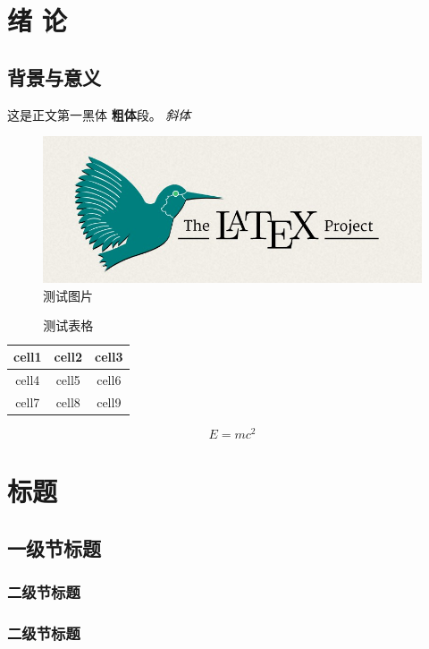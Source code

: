 \documentclass{swjtuthesis}
\begin{document}
\maketot

\startmainmatter

\chapter{绪 论}
\section{背景与意义}

这是正文第一{\heiti 黑体 \textbf{粗体}}段\supercite{stump2000user}。
\textit{斜体}

\begin{figure}[hbt]
    \centering
    \includegraphics[width=0.7\linewidth]{example.jpg}
    \caption{测试图片}
\end{figure}

\begin{table}[hbt]
    \centering
    \caption{测试表格}
    \begin{tabular}{ c|c|c } 
    \hline
    cell1 & cell2 & cell3 \\
    \hline
    cell4 & cell5 & cell6 \\ 
    \hline
    cell7 & cell8 & cell9 \\ 
    \hline
    \end{tabular}
\end{table}

\begin{equation}
    E=mc^2
\end{equation}

\chapter{标题}
\section{一级节标题}
\subsection{二级节标题}
\subsection{二级节标题}
\end{document}
